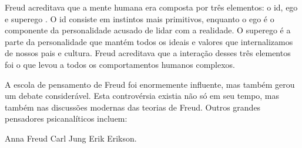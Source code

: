 Freud acreditava que a mente humana era composta por três elementos: o id, ego e superego . O id consiste em instintos mais primitivos, enquanto o ego é o componente da personalidade acusado de lidar com a realidade. O superego é a parte da personalidade que mantém todos os ideais e valores que internalizamos de nossos pais e cultura. Freud acreditava que a interação desses três elementos foi o que levou a todos os comportamentos humanos complexos.

A escola de pensamento de Freud foi enormemente influente, mas também gerou um debate considerável. Esta controvérsia existia não só em seu tempo, mas também nas discussões modernas das teorias de Freud. Outros grandes pensadores psicanalíticos incluem:

Anna Freud
Carl Jung
Erik Erikson.
